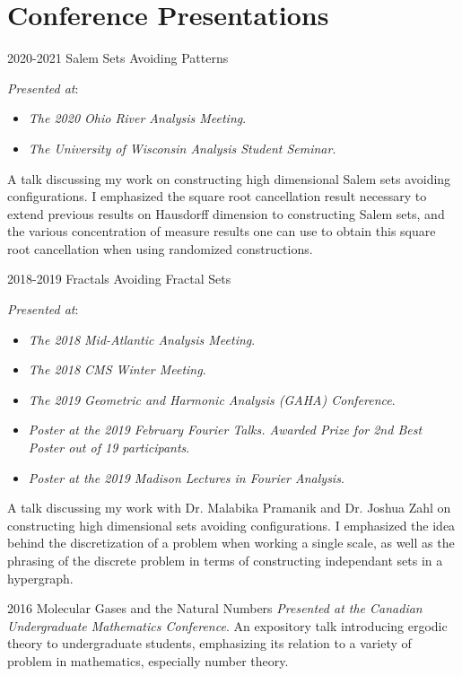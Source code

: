 \documentclass[a4paper]{cv-friggeri}
\begin{document}

\newpage


\section{Conference Presentations}

\begin{entrylist}

\entry
{2020-2021}
{Salem Sets Avoiding Patterns}
{}
{\emph{Presented at}:
%
\begin{itemize}
	\item \emph{The 2020 Ohio River Analysis Meeting}.
	\item \emph{The University of Wisconsin Analysis Student Seminar}.
\end{itemize}
%
A talk discussing my work on constructing high dimensional Salem sets avoiding configurations. I emphasized the square root cancellation result necessary to extend previous results on Hausdorff dimension to constructing Salem sets, and the various concentration of measure results one can use to obtain this square root cancellation when using randomized constructions.}

\entry
{2018-2019}
{Fractals Avoiding Fractal Sets}
{}
{\emph{Presented at}:
%
\begin{itemize}
	\item \emph{The 2018 Mid-Atlantic Analysis Meeting}.
	\item \emph{The 2018 CMS Winter Meeting}.
	\item \emph{The 2019 Geometric and Harmonic Analysis (GAHA) Conference}.
	\item \emph{Poster at the 2019 February Fourier Talks. Awarded Prize for 2nd Best Poster out of 19 participants}.
	\item \emph{Poster at the 2019 Madison Lectures in Fourier Analysis}.
\end{itemize}
%
A talk discussing my work with Dr. Malabika Pramanik and Dr. Joshua Zahl on constructing high dimensional sets avoiding configurations. I emphasized the idea behind the discretization of a problem when working a single scale, as well as the phrasing of the discrete problem in terms of constructing independant sets in a hypergraph.}

\entry
{2016}
{Molecular Gases and the Natural Numbers}
{}
{\emph{Presented at the Canadian Undergraduate Mathematics Conference}. An expository talk introducing ergodic theory to undergraduate students, emphasizing its relation to a variety of problem in mathematics, especially number theory.}

\end{entrylist}
\end{document}

